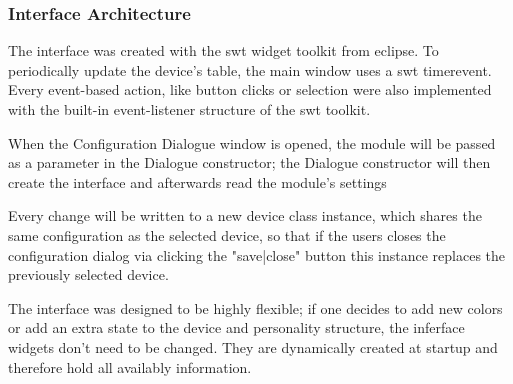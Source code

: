 \subsubsection{Interface Architecture}
The interface was created with the swt widget toolkit from eclipse. To periodically update the device's table, the main window uses a swt timerevent. Every event-based action, like button clicks or selection were also implemented with the built-in event-listener structure of the swt toolkit. 

When the Configuration Dialogue window is opened, the module will be passed as a parameter in the Dialogue constructor; the Dialogue constructor will then create the interface and afterwards read the module's settings 

Every change will be written to a new device class instance, which shares the same configuration as the selected device, so that if the users closes the configuration dialog via clicking the "save|close" button this instance replaces the previously selected device.

The interface was designed to be highly flexible; if one decides to add new colors or add an extra state to the device and personality structure, the inferface widgets don't need to be changed. They are dynamically created at startup and therefore hold all availably information.

